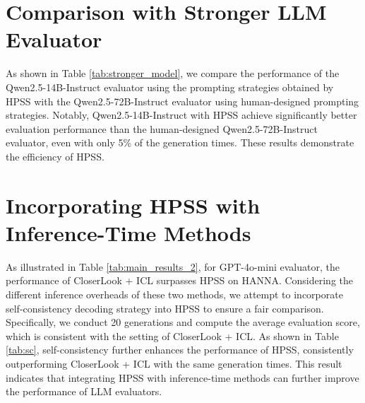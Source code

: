 \section{Comparison with Stronger LLM Evaluator}
\label{appendix:stronger}
As shown in Table \ref{tab:stronger_model}, we compare the performance of the Qwen2.5-14B-Instruct evaluator using the prompting strategies obtained by HPSS with the Qwen2.5-72B-Instruct evaluator using human-designed prompting strategies. 
Notably, Qwen2.5-14B-Instruct with HPSS achieve
significantly better evaluation performance than the human-designed Qwen2.5-72B-Instruct evaluator, even with only 5\% of the generation times.
These results demonstrate the efficiency of HPSS.


\section{Incorporating HPSS with Inference-Time Methods}
\label{appendix:sc}
As illustrated in Table \ref{tab:main_results_2}, for GPT-4o-mini evaluator, 
the performance of CloserLook + ICL surpasses HPSS on HANNA. 
Considering the different inference overheads of these two methods, 
we attempt to incorporate self-consistency \cite{wang2022self} decoding strategy into HPSS to ensure a fair comparison. 
Specifically, we conduct 20 generations and compute the average evaluation score,
which is consistent with the setting of CloserLook + ICL. 
As shown in Table \ref{tab:sc}, self-consistency further enhances the performance of HPSS, consistently outperforming CloserLook + ICL with the same generation times. 
This result indicates that integrating HPSS with inference-time methods can further improve the performance of LLM evaluators.






